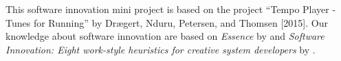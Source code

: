 This software innovation mini project is based on the project “Tempo Player - Tunes for Running” by Drægert, Nduru, Petersen, and Thomsen [2015].
Our knowledge about software innovation are based on \textit{Essence} by \cite{essence} and \textit{Software Innovation: Eight work-style heuristics for creative system developers} by \citet{swi}.
